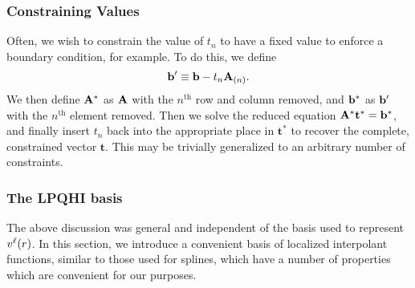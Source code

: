 \subsubsection{Constraining Values}
Often, we wish to constrain the value of $t_n$ to have a fixed value
to enforce a boundary condition, for example.  To do this, we define
\begin{equation}
\bb' \equiv \vb - t_n \bA_{(n)}.
\end{equation}
We then define $\bA^*$ as $\bA$ with the $n^{\text{th}}$ row and column
removed, and $\bb^*$ as $\vb'$ with the $n^{\text{th}}$ element removed.  Then
we solve the reduced equation $\bA^* \mathbf{t}^* = \bb^*$, and
finally insert $t_n$ back into the appropriate place in $\mathbf{t}^*$
to recover the complete, constrained vector $\mathbf{t}$.  This may be
trivially generalized to an arbitrary number of constraints.
\label{sec:contraints}

\subsubsection{The LPQHI basis}
The above discussion was general and independent of the basis used to
represent $\vl(r)$.  In this section, we introduce a convenient basis
of localized interpolant functions, similar to those used for
splines, which have a number of properties which are convenient for
our purposes.  


